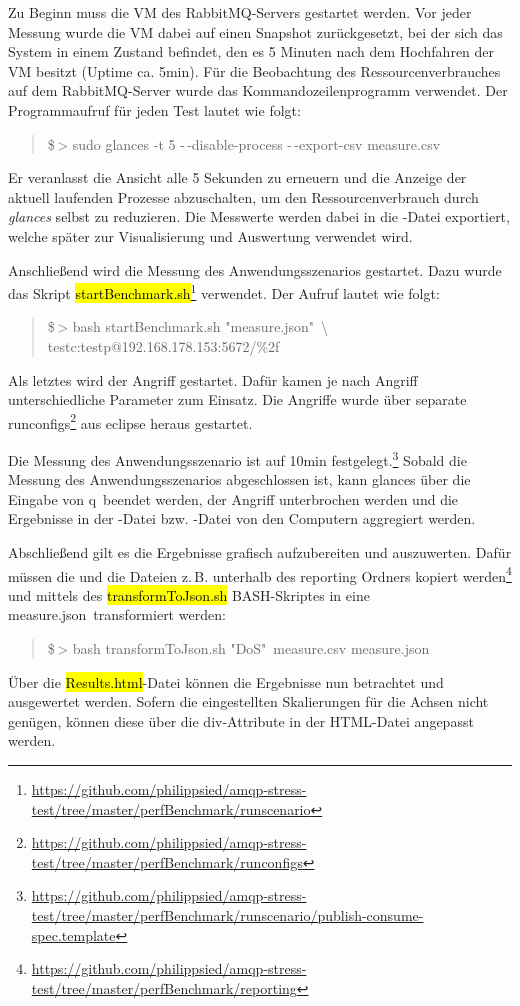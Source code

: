 \documentclass[	a4paper,
			11pt,
			oneside,
			parskip]{scrartcl}
\begin{document}
	Zu Beginn muss die VM des RabbitMQ-Servers gestartet werden. Vor jeder Messung wurde die VM dabei auf einen Snapshot zurückgesetzt, bei der sich das System in einem Zustand befindet,
	den es 5 Minuten nach dem Hochfahren der VM besitzt (Uptime ca. 5min).
	Für die Beobachtung des Ressourcenverbrauches auf dem RabbitMQ-Server wurde das Kommandozeilenprogramm  verwendet.
	Der Programmaufruf für jeden Test lautet wie folgt:
	\begin{quote}
		\ttfamily
		\$\,> sudo glances -t 5 -\,-disable-process -\,-export-csv measure.csv
	\end{quote}
	Er veranlasst die Ansicht alle 5 Sekunden zu erneuern und die Anzeige der aktuell laufenden Prozesse abzuschalten, um den Ressourcenverbrauch durch \textsl{glances} selbst zu reduzieren.
	Die Messwerte werden dabei in die -Datei exportiert, welche später zur Visualisierung und Auswertung verwendet wird.
	
	Anschließend wird die Messung des Anwendungsszenarios gestartet. Dazu wurde das Skript \hl{startBenchmark.sh}\footnote{\url{https://github.com/philippsied/amqp-stress-test/tree/master/perfBenchmark/runscenario}}
	verwendet. Der Aufruf lautet wie folgt:
	\begin{quote}
		\ttfamily
		\$\,> bash startBenchmark.sh "measure.json"\ \textbackslash\\ 
		                    \hspace*{6cm} testc:testp@192.168.178.153:5672/\%2f
	\end{quote}
	
	Als letztes wird der Angriff gestartet. Dafür kamen je nach Angriff unterschiedliche Parameter zum Einsatz. Die Angriffe wurde über separate \glqq runconfigs\grqq\footnote{\url{https://github.com/philippsied/amqp-stress-test/tree/master/perfBenchmark/runconfigs}} aus eclipse heraus gestartet. 
	
	Die Messung des Anwendungsszenario ist auf 10min festgelegt.\footnote{\url{https://github.com/philippsied/amqp-stress-test/tree/master/perfBenchmark/runscenario/publish-consume-spec.template}}
	Sobald die Messung des Anwendungsszenarios abgeschlossen ist, kann glances über die Eingabe von \glqq q\grqq\ beendet werden, der Angriff unterbrochen werden und die Ergebnisse in der -Datei
	bzw. -Datei von den Computern aggregiert werden.
	
	Abschließend gilt es die Ergebnisse grafisch aufzubereiten und auszuwerten. Dafür müssen die  und die  Dateien z.\,B. unterhalb des reporting Ordners kopiert
	werden\footnote{\url{https://github.com/philippsied/amqp-stress-test/tree/master/perfBenchmark/reporting}} und mittels des \hl{transformToJson.sh} BASH-Skriptes in eine \glqq measure.json\grqq\
	transformiert werden:
	\begin{quote}
		\ttfamily
		\$\,> bash transformToJson.sh "DoS"\ measure.csv measure.json
	\end{quote}
	Über die \hl{Results.html}-Datei können die Ergebnisse nun betrachtet und ausgewertet werden. Sofern die eingestellten Skalierungen für die Achsen nicht genügen, können diese über die div-Attribute
	in der HTML-Datei angepasst werden.
	
\end{document}
